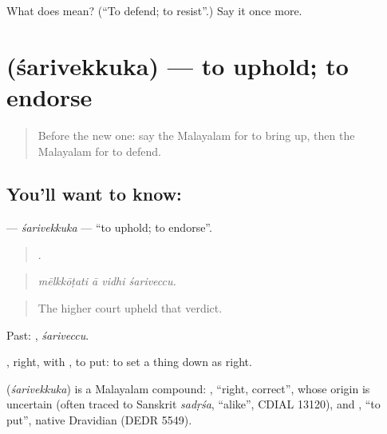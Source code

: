 \begin{tcolorbox}[breakable,colback=teal!4,colframe=teal!35!black,title={Before you move on}]
What does  mean? (\textquotedblleft{}To defend; to resist\textquotedblright{}.) Say it once more.
\end{tcolorbox}
\section[\texorpdfstring{\ml{ശരിവെക്കുക} (śarivekkuka)}{ശരിവെക്കുക (śarivekkuka)}]{ (śarivekkuka) — to uphold; to endorse}

\label{lesson:ML-C454-sarivekkuka}



\begin{quote}
Before the new one: say the Malayalam for to bring up, then the Malayalam for to defend.
\end{quote}

\subsection*{You'll want to know: }
\textbf{} — \emph{śarivekkuka} — \textquotedblleft{}to uphold; to endorse\textquotedblright{}.

\begin{quote}
   .
\end{quote}

\begin{quote}
\emph{mēlkkōṭati ā vidhi śariveccu.}
\end{quote}

\begin{quote}
The higher court upheld that verdict.
\end{quote}

Past: , \emph{śariveccu}.

, right, with , to put: to set a thing down as right.

\begin{cousinweb}
\textbf{} (\emph{śarivekkuka}) is a Malayalam compound: , \textquotedblleft{}right, correct\textquotedblright{}, whose origin is uncertain (often traced to Sanskrit \emph{sadṛśa}, \textquotedblleft{}alike\textquotedblright{}, CDIAL 13120), and , \textquotedblleft{}to put\textquotedblright{}, native Dravidian (DEDR 5549).
\end{cousinweb}

